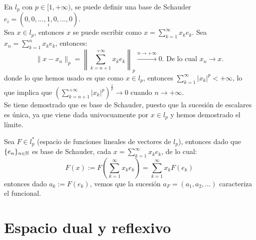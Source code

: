 \begin{ejercicio}
    En $l_p$ con $p \in [1, +\infty)$, se puede definir una base de Schauder $e_i = (0, 0, \dots, \underset{i}{1}, 0, \dots, 0)$. \\

    \noindent
    Sea $x \in l_p$, entonces $x$ se puede escribir como $x = \sum\limits_{k=1}^{\infty} x_k e_k$. Sea $x_n = \sum\limits_{k=1}^{n} x_k e_k$, entonces:
    \begin{equation*}
        \|x - x_n\|_p = \left\| \sum_{k=n+1}^{+\infty} x_k e_k \right\|_p \xrightarrow{n \to +\infty} 0. \text{ De lo cual } x_n \to x.
    \end{equation*}
    donde lo que hemos usado es que como $x \in l_p$, entonces $\sum\limits_{k=1}^{\infty} |x_k|^p < +\infty$, lo que implica que $\left(\sum\limits_{k=n+1}^{+\infty} |x_k|^p \right)^\frac{1}{p} \to 0$ cuando $n \to +\infty$. \\

    \noindent
    Se tiene demostrado que es base de Schauder, puesto que la sucesión de escalares es única, ya que viene dada univocuamente por $x\in l_p$ y hemos demostrado el límite.
\end{ejercicio}

\begin{observacion}
    Sea $F\in l_p^*$ (espacio de funciones lineales de vectores de $l_p$), entonces dado que $\{ e_n \}_{n\in \mathbb{N}}$ es base de Schauder, cada $x = \sum\limits_{k=1}^{\infty} x_k e_k$, de lo cual:
    \begin{equation*}
        F(x) := F\left( \sum_{k=1}^{\infty} x_k e_k \right) = \sum_{k=1}^{\infty} x_k F(e_k)
    \end{equation*}
    entonces dado $a_k := F(e_k)$, vemos que la sucesión $a_F = (a_1, a_2, \dots)$ caracteriza el funcional.
\end{observacion}

\section{Espacio dual y reflexivo}

